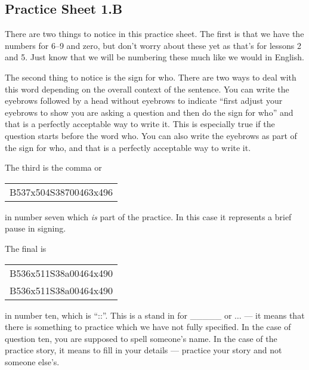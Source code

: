 \documentclass{article}
\begin{document}
\subsection{Practice Sheet 1.B}

There are two things to notice in this practice sheet.
The first is that we have the numbers for 6--9 and zero, but don't worry about these yet as that's for lessons 2 and 5.
Just know that we will be numbering these much like we would in English.

The second thing to notice is the sign for who.
There are two ways to deal with this word depending on the overall context of the sentence.
You can write the eyebrows followed by a head without eyebrows to indicate ``first adjust your eyebrows to show you are asking a question and then do the sign for who'' and that is a perfectly acceptable way to write it.
This is especially true if the question starts before the word who.
You can also write the eyebrows as part of the sign for who, and that is a perfectly acceptable way to write it.

The third is the comma or \begin{tabular}{c}B537x504S38700463x496\end{tabular} in number seven which \emph{is} part of the practice.
In this case it represents a brief pause in signing.

The final is \begin{tabular}{c}B536x511S38a00464x490\\B536x511S38a00464x490\\\end{tabular} in number ten, which is ``::''.
This is a stand in for \_\_\_\_\_ or $\ldots$ --- it means that there is something to practice which we have not fully specified.
In the case of question ten, you are supposed to spell someone's name.
In the case of the practice story, it means to fill in your details --- practice your story and not someone else's.
\end{document}
